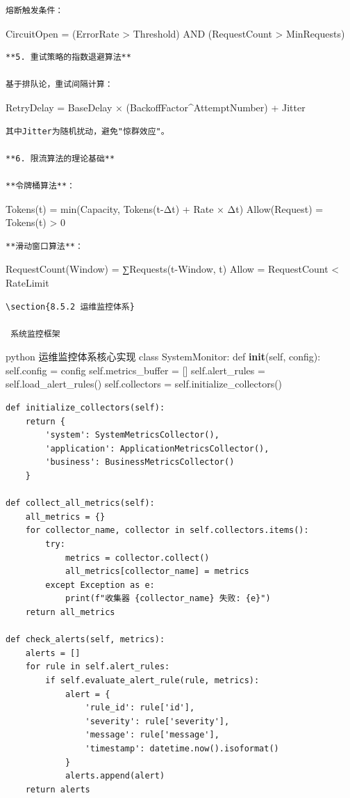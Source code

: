 \begin{lstlisting}
熔断触发条件：
\end{lstlisting}

CircuitOpen = (ErrorRate \textgreater{} Threshold) AND (RequestCount \textgreater{} MinRequests)

\begin{lstlisting}
**5. 重试策略的指数退避算法**

基于排队论，重试间隔计算：
\end{lstlisting}

RetryDelay = BaseDelay × (BackoffFactor\^{}AttemptNumber) + Jitter

\begin{lstlisting}
其中Jitter为随机扰动，避免"惊群效应"。

**6. 限流算法的理论基础**

**令牌桶算法**：
\end{lstlisting}

Tokens(t) = min(Capacity, Tokens(t-Δt) + Rate × Δt) Allow(Request) = Tokens(t) \textgreater{} 0

\begin{lstlisting}
**滑动窗口算法**：
\end{lstlisting}

RequestCount(Window) = ∑Requests(t-Window, t) Allow = RequestCount \textless{} RateLimit

\begin{lstlisting}
\section{8.5.2 运维监控体系}

 系统监控框架
\end{lstlisting}

python  运维监控体系核心实现 class SystemMonitor: def \textbf{init}(self, config): self.config = config self.metrics\_buffer = {[}{]} self.alert\_rules = self.load\_alert\_rules() self.collectors = self.initialize\_collectors()

\begin{verbatim}
def initialize_collectors(self):
    return {
        'system': SystemMetricsCollector(),
        'application': ApplicationMetricsCollector(),
        'business': BusinessMetricsCollector()
    }

def collect_all_metrics(self):
    all_metrics = {}
    for collector_name, collector in self.collectors.items():
        try:
            metrics = collector.collect()
            all_metrics[collector_name] = metrics
        except Exception as e:
            print(f"收集器 {collector_name} 失败: {e}")
    return all_metrics

def check_alerts(self, metrics):
    alerts = []
    for rule in self.alert_rules:
        if self.evaluate_alert_rule(rule, metrics):
            alert = {
                'rule_id': rule['id'],
                'severity': rule['severity'],
                'message': rule['message'],
                'timestamp': datetime.now().isoformat()
            }
            alerts.append(alert)
    return alerts
\end{verbatim}

